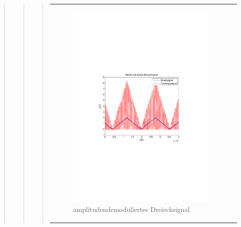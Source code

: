 \begin{quote}
\begin{quote}
\begin{quote}
\begin{center}
\begin{tabular}{ll}
\begin{minipage}{0.6\textwidth}
                    \end{minipage}
                    \begin{minipage}{0.6\textwidth}
    
                         \begin{figure}[H]
                            \label{fig:}
                            \includegraphics[scale=0.5, trim = 2cm 6.5cm 1.5cm
                            8.5cm, clip]{./Bilder/snychDemod_dreieck.pdf} %
                            \caption{amplitudendemoduliertes Dreiecksignal}
                        \end{figure}
                   \vspace{-1.5em}
    
                    \end{minipage}
    

\end{tabular}
\end{center}
\end{quote}
\end{quote}
\end{quote}
